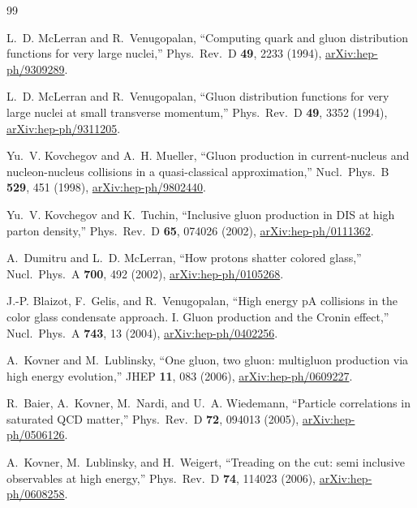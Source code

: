 \documentclass[aps,prd,onecolumn,superscriptaddress,nofootinbib,floatfix,longbibliography,11pt]{revtex4-2}
\numberwithin{equation}{section}
\begin{document}
\begin{thebibliography}{99}

L.~D. McLerran and R.~Venugopalan, ``Computing quark and gluon distribution functions for very large nuclei,'' Phys.\ Rev.\ D \textbf{49}, 2233 (1994), \href{https://arxiv.org/abs/hep-ph/9309289}{arXiv:hep-ph/9309289}.

L.~D. McLerran and R.~Venugopalan, ``Gluon distribution functions for very large nuclei at small transverse momentum,'' Phys.\ Rev.\ D \textbf{49}, 3352 (1994), \href{https://arxiv.org/abs/hep-ph/9311205}{arXiv:hep-ph/9311205}.

Yu.~V. Kovchegov and A.~H. Mueller, ``Gluon production in current-nucleus and nucleon-nucleus collisions in a quasi-classical approximation,'' Nucl.\ Phys.\ B \textbf{529}, 451 (1998), \href{https://arxiv.org/abs/hep-ph/9802440}{arXiv:hep-ph/9802440}.

Yu.~V. Kovchegov and K.~Tuchin, ``Inclusive gluon production in DIS at high parton density,'' Phys.\ Rev.\ D \textbf{65}, 074026 (2002), \href{https://arxiv.org/abs/hep-ph/0111362}{arXiv:hep-ph/0111362}.

A.~Dumitru and L.~D. McLerran, ``How protons shatter colored glass,'' Nucl.\ Phys.\ A \textbf{700}, 492 (2002), \href{https://arxiv.org/abs/hep-ph/0105268}{arXiv:hep-ph/0105268}.

J.-P. Blaizot, F.~Gelis, and R.~Venugopalan, ``High energy pA collisions in the color glass condensate approach. I. Gluon production and the Cronin effect,'' Nucl.\ Phys.\ A \textbf{743}, 13 (2004), \href{https://arxiv.org/abs/hep-ph/0402256}{arXiv:hep-ph/0402256}.

A.~Kovner and M.~Lublinsky, ``One gluon, two gluon: multigluon production via high energy evolution,'' JHEP \textbf{11}, 083 (2006), \href{https://arxiv.org/abs/hep-ph/0609227}{arXiv:hep-ph/0609227}.

R.~Baier, A.~Kovner, M.~Nardi, and U.~A. Wiedemann, ``Particle correlations in saturated QCD matter,'' Phys.\ Rev.\ D \textbf{72}, 094013 (2005), \href{https://arxiv.org/abs/hep-ph/0506126}{arXiv:hep-ph/0506126}.

A.~Kovner, M.~Lublinsky, and H.~Weigert, ``Treading on the cut: semi inclusive observables at high energy,'' Phys.\ Rev.\ D \textbf{74}, 114023 (2006), \href{https://arxiv.org/abs/hep-ph/0608258}{arXiv:hep-ph/0608258}.


\end{thebibliography}
\end{document}
